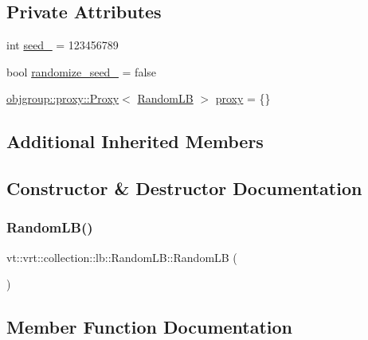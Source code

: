\subsection*{Private Attributes}
\begin{DoxyCompactItemize}
\item 
int \hyperlink{structvt_1_1vrt_1_1collection_1_1lb_1_1_random_l_b_a1b7a01112ed2b0c38fb0c2887200d45a}{seed\+\_\+} = 123456789
\item 
bool \hyperlink{structvt_1_1vrt_1_1collection_1_1lb_1_1_random_l_b_af4968ddfd336c44bd2056e0096c24c8c}{randomize\+\_\+seed\+\_\+} = false
\item 
\hyperlink{structvt_1_1objgroup_1_1proxy_1_1_proxy}{objgroup\+::proxy\+::\+Proxy}$<$ \hyperlink{structvt_1_1vrt_1_1collection_1_1lb_1_1_random_l_b}{Random\+LB} $>$ \hyperlink{structvt_1_1vrt_1_1collection_1_1lb_1_1_random_l_b_a3aa850f295642d55b12c3274f752fc1a}{proxy} = \{\}
\end{DoxyCompactItemize}
\subsection*{Additional Inherited Members}


\subsection{Constructor \& Destructor Documentation}
\mbox{\label{structvt_1_1vrt_1_1collection_1_1lb_1_1_random_l_b_ac6bf4ed6fb55fb787478c5f00d68f20c}} 
\subsubsection{\texorpdfstring{Random\+L\+B()}{RandomLB()}}
{\footnotesize\ttfamily vt\+::vrt\+::collection\+::lb\+::\+Random\+L\+B\+::\+Random\+LB (\begin{DoxyParamCaption}{ }\end{DoxyParamCaption})\hspace{0.3cm}{\ttfamily [default]}}



\subsection{Member Function Documentation}
\mbox{\label{structvt_1_1vrt_1_1collection_1_1lb_1_1_random_l_b_a82f4963022fe65edd8dcd30e53525e07}} 
